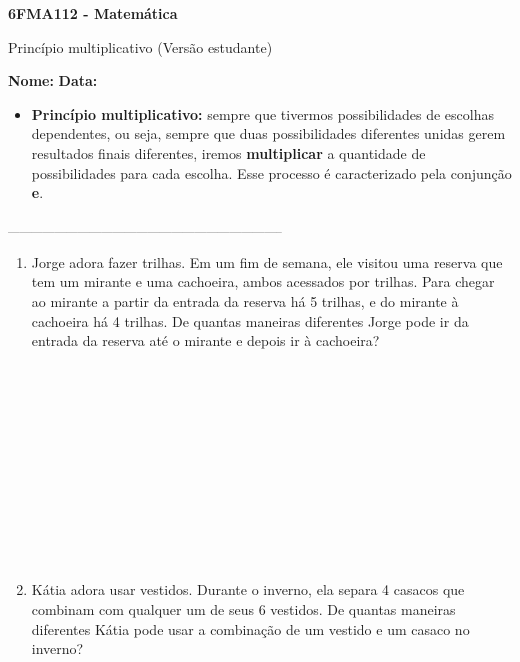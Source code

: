 \documentclass[a4paper,14pt]{article}
\begin{document}
	
	\noindent\textbf{6FMA112 - Matemática} 
	
	\begin{center}Princípio multiplicativo (Versão estudante)
	\end{center}
	
	\noindent\textbf{Nome:} \underline{\hspace{10cm}}
	\noindent\textbf{Data:} \underline{\hspace{4cm}}
	
	
	\begin{multicols}{2}
		\noindent \begin{itemize} 
		\item \textbf{Princípio multiplicativo:} sempre que tivermos possibilidades de escolhas dependentes, ou seja, sempre que duas possibilidades diferentes unidas gerem resultados finais diferentes, iremos \textbf{multiplicar} a quantidade de possibilidades para cada escolha. Esse processo é caracterizado pela conjunção \textbf{e}.
		\end{itemize}
		\noindent\textsubscript{-----------------------------------------------------------------------}
		\begin{enumerate} 
			\item Jorge adora fazer trilhas. Em um fim de semana, ele visitou uma reserva que tem um mirante e uma cachoeira, ambos acessados por trilhas. Para chegar ao mirante a partir da entrada da reserva há 5 trilhas, e do mirante à cachoeira há 4 trilhas. De quantas maneiras diferentes Jorge pode ir da entrada da reserva até o mirante e depois ir à cachoeira? \\\\\\\\\\\\\\\\\\\\\\\\
			\item Kátia adora usar vestidos. Durante o inverno, ela separa 4 casacos que combinam com qualquer um de seus 6 vestidos. De quantas maneiras diferentes Kátia pode usar a combinação de um vestido e um casaco no inverno? \\\\\\\\\\\\\\\\\\\\\\\\

\end{enumerate}
\end{multicols}
\end{document}
